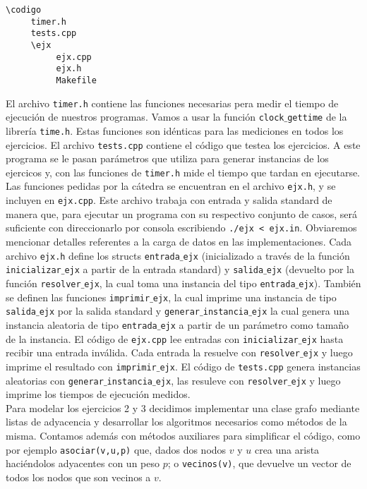\documentclass[10pt,a4paper]{article}
\begin{document}
\begin{verbatim}
\codigo
	 timer.h
	 tests.cpp
     \ejx
          ejx.cpp
          ejx.h
          Makefile
\end{verbatim}

El archivo \texttt{timer.h} contiene las funciones necesarias pera medir el
tiempo de ejecución de nuestros programas. Vamos a usar la función
\texttt{clock$\_$gettime} de la librería \texttt{time.h}. Estas funciones son
idénticas para las mediciones en todos los ejercicios. El archivo
\texttt{tests.cpp} contiene el código que testea los ejercicios. A este
programa se le pasan parámetros que utiliza para generar instancias de los
ejercicos y, con las funciones de \texttt{timer.h} mide el tiempo que tardan
en ejecutarse. Las funciones pedidas por la cátedra se encuentran en el
archivo \texttt{ejx.h}, y se incluyen en \texttt{ejx.cpp}. Este archivo
trabaja con entrada y salida standard de manera que, para ejecutar un programa
con su respectivo conjunto de casos, será suficiente con direccionarlo por
consola escribiendo \texttt{./ejx < ejx.in}. Obviaremos mencionar detalles
referentes a la carga de datos en las implementaciones. Cada archivo
\texttt{ejx.h} define los structs \texttt{entrada$\_$ejx} (inicializado a través
de la función \texttt{inicializar$\_$ejx} a partir de la entrada standard) y
\texttt{salida$\_$ejx} (devuelto por la función \texttt{resolver$\_$ejx}, la cual
toma una instancia del tipo \texttt{entrada$\_$ejx}). También se definen las
funciones \texttt{imprimir$\_$ejx}, la cual imprime una instancia de tipo
\texttt{salida$\_$ejx} por la salida standard y \texttt{generar$\_$instancia$\_$ejx}
la cual genera una instancia aleatoria de tipo \texttt{entrada$\_$ejx} a partir
de un parámetro como tamaño de la instancia. El código de \texttt{ejx.cpp}
lee entradas con \texttt{inicializar$\_$ejx} hasta recibir una entrada inválida.
Cada entrada la resuelve con \texttt{resolver$\_$ejx} y luego imprime el
resultado con \texttt{imprimir$\_$ejx}. El código de \texttt{tests.cpp} genera
instancias aleatorias con \texttt{generar$\_$instancia$\_$ejx}, las resuleve con
\texttt{resolver$\_$ejx} y luego imprime los tiempos de ejecución medidos.\\

Para modelar los ejercicios 2 y 3 decidimos implementar una clase grafo mediante listas de adyacencia y desarrollar los algoritmos necesarios como métodos de la misma. Contamos además con métodos auxiliares para simplificar el código, como por ejemplo \texttt{asociar(v,u,p)} que, dados dos nodos $v$ y $u$ crea una arista haciéndolos adyacentes con un peso $p$; o \texttt{vecinos(v)}, que devuelve un vector de todos los nodos que son vecinos a $v$.
\end{document}
